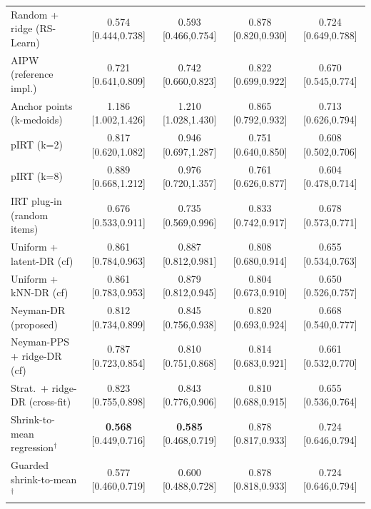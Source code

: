 \begin{tabular}{l cccc}
Random + ridge (RS-Learn) & 0.574 {\scriptsize[0.444,0.738]} & 0.593 {\scriptsize[0.466,0.754]} & 0.878 {\scriptsize[0.820,0.930]} & 0.724 {\scriptsize[0.649,0.788]} \\
AIPW (reference impl.) & 0.721 {\scriptsize[0.641,0.809]} & 0.742 {\scriptsize[0.660,0.823]} & 0.822 {\scriptsize[0.699,0.922]} & 0.670 {\scriptsize[0.545,0.774]} \\
Anchor points (k-medoids) & 1.186 {\scriptsize[1.002,1.426]} & 1.210 {\scriptsize[1.028,1.430]} & 0.865 {\scriptsize[0.792,0.932]} & 0.713 {\scriptsize[0.626,0.794]} \\
pIRT (k=2) & 0.817 {\scriptsize[0.620,1.082]} & 0.946 {\scriptsize[0.697,1.287]} & 0.751 {\scriptsize[0.640,0.850]} & 0.608 {\scriptsize[0.502,0.706]} \\
pIRT (k=8) & 0.889 {\scriptsize[0.668,1.212]} & 0.976 {\scriptsize[0.720,1.357]} & 0.761 {\scriptsize[0.626,0.877]} & 0.604 {\scriptsize[0.478,0.714]} \\
IRT plug-in (random items) & 0.676 {\scriptsize[0.533,0.911]} & 0.735 {\scriptsize[0.569,0.996]} & 0.833 {\scriptsize[0.742,0.917]} & 0.678 {\scriptsize[0.573,0.771]} \\
Uniform + latent-DR (cf) & 0.861 {\scriptsize[0.784,0.963]} & 0.887 {\scriptsize[0.812,0.981]} & 0.808 {\scriptsize[0.680,0.914]} & 0.655 {\scriptsize[0.534,0.763]} \\
Uniform + kNN-DR (cf) & 0.861 {\scriptsize[0.783,0.953]} & 0.879 {\scriptsize[0.812,0.945]} & 0.804 {\scriptsize[0.673,0.910]} & 0.650 {\scriptsize[0.526,0.757]} \\
Neyman-DR (proposed) & 0.812 {\scriptsize[0.734,0.899]} & 0.845 {\scriptsize[0.756,0.938]} & 0.820 {\scriptsize[0.693,0.924]} & 0.668 {\scriptsize[0.540,0.777]} \\
Neyman-PPS + ridge-DR (cf) & 0.787 {\scriptsize[0.723,0.854]} & 0.810 {\scriptsize[0.751,0.868]} & 0.814 {\scriptsize[0.683,0.921]} & 0.661 {\scriptsize[0.532,0.770]} \\
Strat.\ + ridge-DR (cross-fit) & 0.823 {\scriptsize[0.755,0.898]} & 0.843 {\scriptsize[0.776,0.906]} & 0.810 {\scriptsize[0.688,0.915]} & 0.655 {\scriptsize[0.536,0.764]} \\
Shrink-to-mean regression$^\dagger$ & \textbf{0.568} {\scriptsize[0.449,0.716]} & \textbf{0.585} {\scriptsize[0.468,0.719]} & 0.878 {\scriptsize[0.817,0.933]} & 0.724 {\scriptsize[0.646,0.794]} \\
Guarded shrink-to-mean$^\dagger$ & 0.577 {\scriptsize[0.460,0.719]} & 0.600 {\scriptsize[0.488,0.728]} & 0.878 {\scriptsize[0.818,0.933]} & 0.724 {\scriptsize[0.646,0.794]} \\

\end{tabular}
